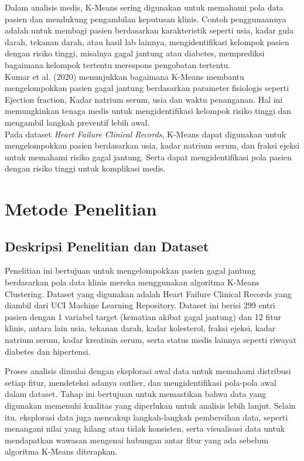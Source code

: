 \documentclass[english,12pt,a4paper,openany]{book}
\begin{document}
	Dalam analisis medis, K-Means sering digunakan untuk memahami pola data pasien dan mendukung pengambilan keputusan klinis. Contoh penggunaannya adalah untuk membagi pasien berdasarkan karakteristik seperti usia, kadar gula darah, tekanan darah, atau hasil lab lainnya, mengidentifikasi kelompok pasien dengan risiko tinggi, misalnya gagal jantung atau diabetes, memprediksi bagaimana kelompok tertentu merespons pengobatan tertentu. \\
	
	Kumar et al. (2020) menunjukkan bagaimana K-Means membantu mengelompokkan pasien gagal jantung berdasarkan parameter fisiologis seperti Ejection fraction, Kadar natrium serum, usia dan waktu penanganan. Hal ini memungkinkan tenaga medis untuk mengidentifikasi kelompok risiko tinggi dan mengambil langkah preventif lebih awal. \\
	
	Pada dataset \textit{Heart Failure Clinical Records}, K-Means dapat digunakan untuk mengelompokkan pasien berdasarkan usia, kadar natrium serum, dan fraksi ejeksi untuk memahami risiko gagal jantung. Serta dapat mengidentifikasi pola pasien dengan risiko tinggi untuk komplikasi medis.  
	
	
	
	
	\chapter{Metode Penelitian} 
	\section{Deskripsi Penelitian dan Dataset}
	
	Penelitian ini bertujuan untuk mengelompokkan pasien gagal jantung berdasarkan pola data klinis mereka menggunakan algoritma K-Means Clustering. Dataset yang digunakan adalah Heart Failure Clinical Records yang diambil dari UCI Machine Learning Repository. Dataset ini berisi 299 entri pasien dengan 1 variabel target (kematian akibat gagal jantung) dan 12 fitur klinis, antara lain usia, tekanan darah, kadar kolesterol, fraksi ejeksi, kadar natrium serum, kadar kreatinin serum, serta status medis lainnya seperti riwayat diabetes dan hipertensi.
	
	Proses analisis dimulai dengan eksplorasi awal data untuk memahami distribusi setiap fitur, mendeteksi adanya outlier, dan mengidentifikasi pola-pola awal dalam dataset. Tahap ini bertujuan untuk memastikan bahwa data yang digunakan memenuhi kualitas yang diperlukan untuk analisis lebih lanjut. Selain itu, eksplorasi data juga mencakup langkah-langkah pembersihan data, seperti menangani nilai yang hilang atau tidak konsisten, serta visualisasi data untuk mendapatkan wawasan mengenai hubungan antar fitur yang ada sebelum algoritma K-Means diterapkan.
	
\end{document}
